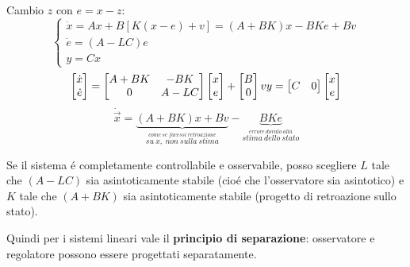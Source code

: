 \documentclass[../main.tex]{subfiles}
\begin{document}
		Cambio $ z $ con $ e = x-z $:
		\[
			\begin{cases}
				\dot x = Ax + B\left[ K(x-e)+v \right] = (A+BK) x - BKe + Bv\\
				\dot e = (A-LC) e\\
				y = Cx
			\end{cases}
		\]
		\[
			\begin{bmatrix}
				\dot x\\
				\dot e
			\end{bmatrix} = 
			\begin{bmatrix}
				A+BK & -BK\\
				0 & A-LC
			\end{bmatrix}
			\begin{bmatrix}
				x\\
				e
			\end{bmatrix} +
			\begin{bmatrix}
				B\\
				0
			\end{bmatrix} v
			\\
			y =
			\begin{bmatrix}
				C & 0
			\end{bmatrix}
			\begin{bmatrix}
				x\\
				e
			\end{bmatrix}
		\]
		\[
			\dot{\vec x} = \underbrace{(A+BK)x + Bv}_{\stackrel{come\ se\ facessi\ retroazione}{su\ x,\ non\ sulla\ stima}} - \underbrace{BKe}_{\stackrel{errore\ dovuto\ alla}{stima\ dello\ stato}}
		\]
		
		Se il sistema \'e completamente controllabile e osservabile, posso scegliere $ L $ tale che $ (A-LC) $ sia asintoticamente stabile (cio\'e che l'osservatore sia asintotico) e $ K $ tale che $ (A+BK) $ sia asintoticamente stabile (progetto di retroazione sullo stato).
		
		Quindi per i sistemi lineari vale il \textbf{principio di separazione}: osservatore e regolatore possono essere progettati separatamente.
		
\end{document}
